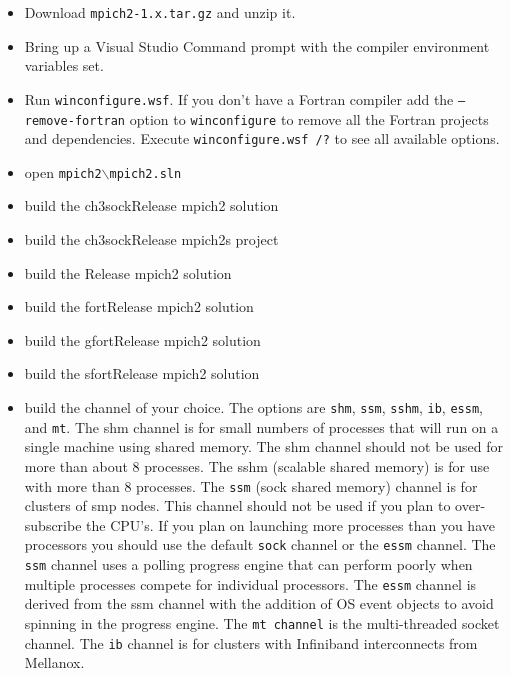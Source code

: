 \documentclass[dvipdfm,11pt]{article}
\begin{document}
\begin{itemize}
\item
Download \texttt{mpich2-1.x.tar.gz} and unzip it.
\item
Bring up a Visual Studio Command prompt with the compiler environment 
variables set.
\item
Run \texttt{winconfigure.wsf}. If you don't have a Fortran compiler add the 
\texttt{--remove-fortran} option to \texttt{winconfigure} to remove all the Fortran 
projects and dependencies.  Execute \texttt{winconfigure.wsf /?} to see all
available options.
\item 
    open \texttt{mpich2$\backslash$mpich2.sln}
\item
    build the ch3sockRelease mpich2 solution
\item
    build the ch3sockRelease mpich2s project
\item
    build the Release mpich2 solution
\item
    build the fortRelease mpich2 solution
\item
    build the gfortRelease mpich2 solution
\item
    build the sfortRelease mpich2 solution
\item
    build the channel of your choice.  The options are \texttt{shm}, \texttt{ssm}, \texttt{sshm}, \texttt{ib}, \texttt{essm}, and \texttt{mt}.  
The shm channel is for small numbers of processes that will run on a single 
machine using shared memory.  The shm channel should not be used for more 
than about 8 processes.  The sshm (scalable shared memory) is for use with 
more than 8 processes.  The \texttt{ssm} (sock shared memory) channel is for clusters 
of smp nodes.  This channel should not be used if you plan to over-subscribe 
the CPU's.  If you plan on launching more processes than you have processors 
you should use the default \texttt{sock} channel or the \texttt{essm} channel.  The \texttt{ssm} channel 
uses a polling progress engine that can perform poorly when multiple processes 
compete for individual processors.  The \texttt{essm} channel is derived from the ssm channel
with the addition of OS event objects to avoid spinning in the progress engine.  The \texttt{mt
channel} is the multi-threaded socket channel.  The \texttt{ib} channel is for clusters with Infiniband
interconnects from Mellanox.

\end{itemize}
\end{document}
